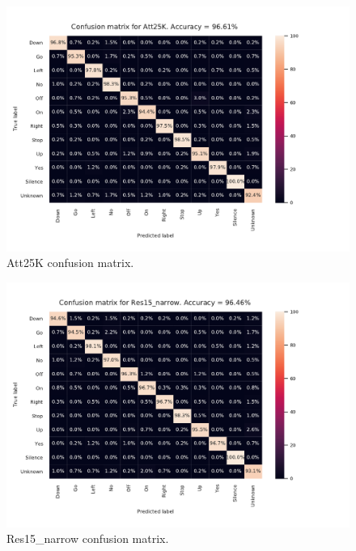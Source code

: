 
\begin{figure}[htbp]
\centerline{\includegraphics[scale=.5]{conf_att.pdf}}
\caption{Att25K confusion matrix.}
\label{conf_att}
\end{figure}

\begin{figure}[htbp]
\centerline{\includegraphics[scale=.5]{conf_res.pdf}}
\caption{Res15\_narrow confusion matrix.}
\label{conf_res}
\end{figure}


